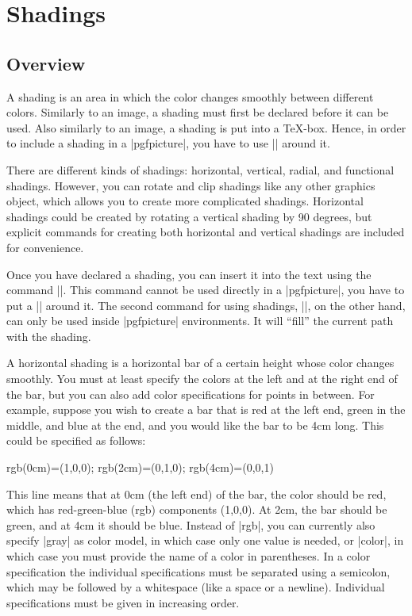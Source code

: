 %
%
%


\section{Shadings}
\label{section-shadings}

\subsection{Overview}

A shading is an area in which the color changes smoothly between different
colors. Similarly to an image, a shading must first be declared before it can
be used. Also similarly to an image, a shading is put into a \TeX-box. Hence,
in order to include a shading in a |{pgfpicture}|, you have to use |\pgftext|
around it.

There are different kinds of shadings: horizontal, vertical, radial, and
functional shadings. However, you can rotate and clip shadings like any other
graphics object, which allows you to create more complicated shadings.
Horizontal shadings could be created by rotating a vertical shading by 90
degrees, but explicit commands for creating both horizontal and vertical
shadings are included for convenience.

Once you have declared a shading, you can insert it into the text using the
command |\pgfuseshading|. This command cannot be used directly in a
|{pgfpicture}|, you have to put a |\pgftext| around it. The second command for
using shadings, |\pgfshadepath|, on the other hand, can only be used  inside
|{pgfpicture}| environments. It will ``fill'' the current path with the
shading.

A horizontal shading is a horizontal bar of a certain height whose color
changes smoothly. You must at least specify the colors at the left and at the
right end of the bar, but you can also add color specifications for points in
between. For example, suppose you wish to create a bar that is red at the left
end, green in the middle, and blue at the end, and you would like the bar to be
4cm long. This could be specified as follows:
%
\begin{codeexample}
rgb(0cm)=(1,0,0); rgb(2cm)=(0,1,0); rgb(4cm)=(0,0,1)
\end{codeexample}
%
This line means that at 0cm (the left end) of the bar, the color should be red,
which has red-green-blue (rgb) components (1,0,0). At 2cm, the bar should be
green, and at 4cm it should be blue. Instead of |rgb|, you can currently also
specify |gray| as color model, in which case only one value is needed, or
|color|, in which case you must provide the name of a color in parentheses. In
a color specification the individual specifications must be separated using a
semicolon, which may be followed by a whitespace (like a space or a newline).
Individual specifications must be given in increasing order.


